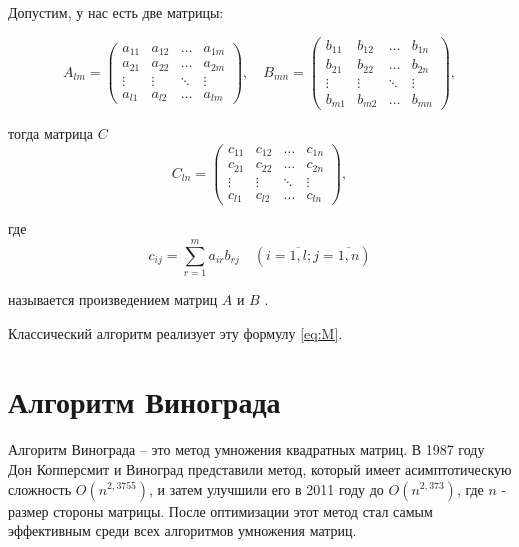 Допустим, у нас есть две матрицы:

\begin{equation}
	A_{lm} = \begin{pmatrix}
		a_{11} & a_{12} & \ldots & a_{1m}\\
		a_{21} & a_{22} & \ldots & a_{2m}\\
		\vdots & \vdots & \ddots & \vdots\\
		a_{l1} & a_{l2} & \ldots & a_{lm}
	\end{pmatrix},
	\quad
	B_{mn} = \begin{pmatrix}
		b_{11} & b_{12} & \ldots & b_{1n}\\
		b_{21} & b_{22} & \ldots & b_{2n}\\
		\vdots & \vdots & \ddots & \vdots\\
		b_{m1} & b_{m2} & \ldots & b_{mn}
	\end{pmatrix},
\end{equation}

тогда матрица $C$
\begin{equation}
	C_{ln} = \begin{pmatrix}
		c_{11} & c_{12} & \ldots & c_{1n}\\
		c_{21} & c_{22} & \ldots & c_{2n}\\
		\vdots & \vdots & \ddots & \vdots\\
		c_{l1} & c_{l2} & \ldots & c_{ln}
	\end{pmatrix},
\end{equation}

где
\begin{equation}
	\label{eq:M}
	c_{ij} =
	\sum_{r=1}^{m} a_{ir}b_{rj} \quad (i=\overline{1,l}; j=\overline{1,n})
\end{equation}

называется произведением матриц $A$ и $B$ \cite{book_matrix}.

Классический алгоритм реализует эту формулу \ref{eq:M}.

\section{Алгоритм Винограда}

Алгоритм Винограда \cite{book_vinograd} -- это метод умножения квадратных матриц. 
В 1987 году Дон Копперсмит и Виноград представили метод, который имеет асимптотическую сложность $O(n^{2,3755})$, и затем улучшили его в 2011 году до $O(n^{2,373})$, где $n$ - размер стороны матрицы. 
После оптимизации этот метод стал самым эффективным среди всех алгоритмов умножения матриц.

